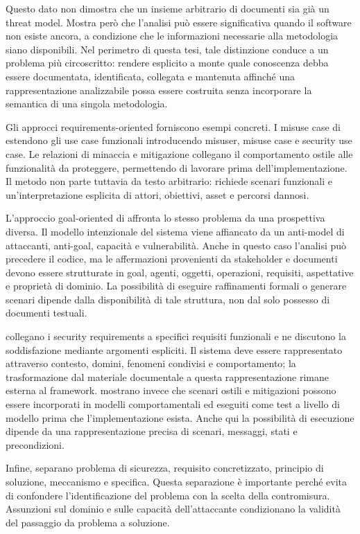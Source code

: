 \documentclass[12pt,a4paper,oneside]{report}
\begin{document}
Questo dato non dimostra che un insieme arbitrario di documenti sia già un threat model. Mostra però che l'analisi può essere significativa quando il software non esiste ancora, a condizione che le informazioni necessarie alla metodologia siano disponibili. Nel perimetro di questa tesi, tale distinzione conduce a un problema più circoscritto: rendere esplicito a monte quale conoscenza debba essere documentata, identificata, collegata e mantenuta affinché una rappresentazione analizzabile possa essere costruita senza incorporare la semantica di una singola metodologia.

Gli approcci requirements-oriented forniscono esempi concreti. I misuse case di \citet{sindre2005eliciting} estendono gli use case funzionali introducendo misuser, misuse case e security use case. Le relazioni di minaccia e mitigazione collegano il comportamento ostile alle funzionalità da proteggere, permettendo di lavorare prima dell'implementazione. Il metodo non parte tuttavia da testo arbitrario: richiede scenari funzionali e un'interpretazione esplicita di attori, obiettivi, asset e percorsi dannosi.

L'approccio goal-oriented di \citet{vanlamsweerde2004elaborating} affronta lo stesso problema da una prospettiva diversa. Il modello intenzionale del sistema viene affiancato da un anti-model di attaccanti, anti-goal, capacità e vulnerabilità. Anche in questo caso l'analisi può precedere il codice, ma le affermazioni provenienti da stakeholder e documenti devono essere strutturate in goal, agenti, oggetti, operazioni, requisiti, aspettative e proprietà di dominio. La possibilità di eseguire raffinamenti formali o generare scenari dipende dalla disponibilità di tale struttura, non dal solo possesso di documenti testuali.

\citet{haley2008securityrequirements} collegano i security requirements a specifici requisiti funzionali e ne discutono la soddisfazione mediante argomenti espliciti. Il sistema deve essere rappresentato attraverso contesto, domini, fenomeni condivisi e comportamento; la trasformazione dal materiale documentale a questa rappresentazione rimane esterna al framework. \citet{whittle2008executable} mostrano invece che scenari ostili e mitigazioni possono essere incorporati in modelli comportamentali ed eseguiti come test a livello di modello prima che l'implementazione esista. Anche qui la possibilità di esecuzione dipende da una rappresentazione precisa di scenari, messaggi, stati e precondizioni.

Infine, \citet{hatebur2006securityengineering} separano problema di sicurezza, requisito concretizzato, principio di soluzione, meccanismo e specifica. Questa separazione è importante perché evita di confondere l'identificazione del problema con la scelta della contromisura. Assunzioni sul dominio e sulle capacità dell'attaccante condizionano la validità del passaggio da problema a soluzione.
\end{document}
